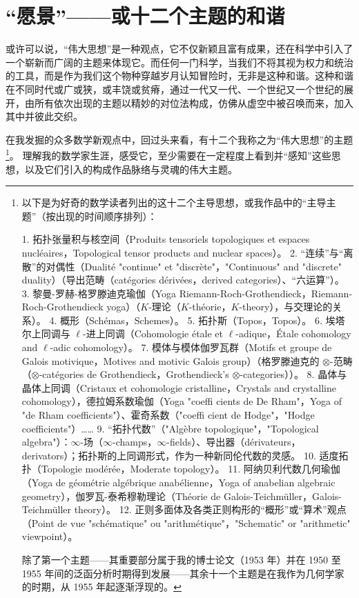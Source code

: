 \section{“愿景”——或十二个主题的和谐}

或许可以说，“伟大思想”是一种观点，它不仅新颖且富有成果，还在科学中引入了一个崭新而广阔的主题来体现它。而任何一门科学，当我们不将其视为权力和统治的工具，而是作为我们这个物种穿越岁月认知冒险时，无非是这种和谐。这种和谐在不同时代或广或狭，或丰饶或贫瘠，通过一代又一代、一个世纪又一个世纪的展开，由所有依次出现的主题以精妙的对位法构成，仿佛从虚空中被召唤而来，加入其中并彼此交织。

在我发掘的众多数学新观点中，回过头来看，有十二个我称之为“伟大思想”的主题 \footnote{以下是为好奇的数学读者列出的这十二个主导思想，或我作品中的“主导主题”（按出现的时间顺序排列）：

1. 拓扑张量积与核空间（Produits tensoriels topologiques et espaces nucléaires，Topological tensor products and nuclear spaces）。  
2. “连续”与“离散”的对偶性（Dualité "continue" et "discrète"，"Continuous" and "discrete" duality）（导出范畴（catégories dérivées，derived categories）、“六运算”）。  
3. 黎曼-罗赫-格罗滕迪克瑜伽（Yoga Riemann-Roch-Grothendieck，Riemann-Roch-Grothendieck yoga）（$K$-理论（$K$-théorie，$K$-theory），与交理论的关系）。  
4. 概形（Schémas，Schemes）。  
5. 拓扑斯（Topos，Topos）。  
6. 埃塔尔上同调与 $\ell$-进上同调（Cohomologie étale et $\ell$-adique，Étale cohomology and $\ell$-adic cohomology）。  
7. 模体与模体伽罗瓦群（Motifs et groupe de Galois motivique，Motives and motivic Galois group）（格罗滕迪克的 $\otimes$-范畴（$\otimes$-catégories de Grothendieck，Grothendieck’s $\otimes$-categories））。  
8. 晶体与晶体上同调（Cristaux et cohomologie cristalline，Crystals and crystalline cohomology），德拉姆系数瑜伽（Yoga "coeffi cients de De Rham"，Yoga of "de Rham coefficients"）、霍奇系数（"coeffi cient de Hodge"，"Hodge coefficients"）……  
9. “拓扑代数”（"Algèbre topologique"，"Topological algebra"）：$\infty$-场（$\infty$-champs，$\infty$-fields）、导出器（dérivateurs，derivators）；拓扑斯的上同调形式，作为一种新同伦代数的灵感。  
10. 适度拓扑（Topologie modérée，Moderate topology）。  
11. 阿纳贝利代数几何瑜伽（Yoga de géométrie algébrique anabélienne，Yoga of anabelian algebraic geometry），伽罗瓦-泰希穆勒理论（Théorie de Galois-Teichmüller，Galois-Teichmüller theory）。  
12. 正则多面体及各类正则构形的“概形”或“算术”观点（Point de vue "schématique" ou "arithmétique"，"Schematic" or "arithmetic" viewpoint）。

除了第一个主题——其重要部分属于我的博士论文（1953 年）并在 1950 至 1955 年间的泛函分析时期得到发展——其余十一个主题是在我作为几何学家的时期，从 1955 年起逐渐浮现的。}。  
理解我的数学家生涯，感受它，至少需要在一定程度上看到并“感知”这些思想，以及它们引入的构成作品脉络与灵魂的伟大主题。

